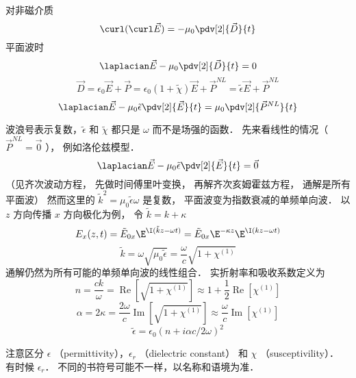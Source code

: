 
对非磁介质
\begin{equation}
  \curl (\curl \vec E) =  - {\mu_0} \pdv[2]{\vec D}{t}
 \end{equation}
平面波时
 \begin{equation}
  {\laplacian}\vec E - {\mu_0} \pdv[2]{\vec D}{t} = 0
 \end{equation}
 \begin{equation}
\vec D = {\epsilon_0}\vec E + \vec P = {\epsilon_0}(1 + \tilde \chi )\vec E + {\vec P^{NL}} = \tilde \epsilon \vec E + {\vec P^{NL}}
 \end{equation}
 \begin{equation}
{\laplacian}\vec E - {\mu_0}\tilde \epsilon \pdv[2]{\vec E}{t} = {\mu_0} \pdv[2]{\vec P^{NL}}{t}
 \end{equation}
 
波浪号表示复数，$\tilde \epsilon$ 和 $\tilde \chi $ 都只是 $\omega $ 而不是场强的函数． 先来看线性的情况（ ${\vec P^{NL}} = \vec 0$ ）， 例如洛伦兹模型．
\begin{equation}
{\laplacian}\vec E - {\mu_0}\tilde \epsilon \pdv[2]{\vec E}{t} = \vec 0
 \end{equation}
（见齐次波动方程， 先做时间傅里叶变换， 再解齐次亥姆霍兹方程， 通解是所有平面波） 然而这里的 ${\tilde k^2} = {\mu_0}\tilde \epsilon \omega$ 是复数， 平面波变为指数衰减的单频单向波． 以 $z$ 方向传播 $x$ 方向极化为例， 令  $\tilde k = k + \kappa $ 
\begin{equation}
{E_x}(z,t) = {\tilde E_{0x}}{\E^{\I(\tilde kz - \omega t)}} = {\tilde E_{0x}}{\E^{ - \kappa z}}{\E^{\I(kz - \omega t)}}
\end{equation}
\begin{equation}
\tilde k = \omega \sqrt {{\mu_0}\tilde \epsilon }  = \frac{\omega }{c}\sqrt {1 + {\chi ^{(1)}}}
\end{equation}
通解仍然为所有可能的单频单向波的线性组合． 实折射率和吸收系数定义为
\begin{equation}
n = \frac{ck}{\omega } = \operatorname{Re} \left[ {\sqrt {1 + {\chi ^{(1)}}} } \right] \approx 1 + \frac{1}{2}\operatorname{Re} [{\chi ^{(1)}}]
\end{equation}
\begin{equation}
\alpha  = 2\kappa  = \frac{2\omega }{c}\operatorname{Im} \left[ {\sqrt {1 + {\chi ^{(1)}}} } \right] \approx \frac{\omega }{c}\operatorname{Im} [{\chi ^{(1)}}]
\end{equation}
\begin{equation}
\tilde \epsilon  = {\epsilon_0}{(n + i\alpha c/2\omega )^2}
\end{equation}
 
注意区分 $\epsilon$ 
（permittivity），${\epsilon_r}$ （dielectric constant） 和 $\chi $ （susceptivility）． 有时候 ${\epsilon_r}$． 不同的书符号可能不一样，以名称和语境为准．

